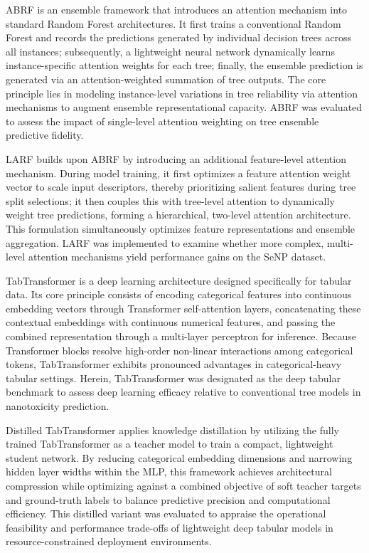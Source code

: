 ABRF is an ensemble framework that introduces an attention mechanism into standard Random Forest architectures. It first trains a conventional Random Forest and records the predictions generated by individual decision trees across all instances; subsequently, a lightweight neural network dynamically learns instance-specific attention weights for each tree; finally, the ensemble prediction is generated via an attention-weighted summation of tree outputs. The core principle lies in modeling instance-level variations in tree reliability via attention mechanisms to augment ensemble representational capacity. ABRF was evaluated to assess the impact of single-level attention weighting on tree ensemble predictive fidelity.

LARF builds upon ABRF by introducing an additional feature-level attention mechanism. During model training, it first optimizes a feature attention weight vector to scale input descriptors, thereby prioritizing salient features during tree split selections; it then couples this with tree-level attention to dynamically weight tree predictions, forming a hierarchical, two-level attention architecture. This formulation simultaneously optimizes feature representations and ensemble aggregation. LARF was implemented to examine whether more complex, multi-level attention mechanisms yield performance gains on the SeNP dataset.

TabTransformer is a deep learning architecture designed specifically for tabular data. Its core principle consists of encoding categorical features into continuous embedding vectors through Transformer self-attention layers, concatenating these contextual embeddings with continuous numerical features, and passing the combined representation through a multi-layer perceptron for inference. Because Transformer blocks resolve high-order non-linear interactions among categorical tokens, TabTransformer exhibits pronounced advantages in categorical-heavy tabular settings. Herein, TabTransformer was designated as the deep tabular benchmark to assess deep learning efficacy relative to conventional tree models in nanotoxicity prediction.

Distilled TabTransformer applies knowledge distillation by utilizing the fully trained TabTransformer as a teacher model to train a compact, lightweight student network. By reducing categorical embedding dimensions and narrowing hidden layer widths within the MLP, this framework achieves architectural compression while optimizing against a combined objective of soft teacher targets and ground-truth labels to balance predictive precision and computational efficiency. This distilled variant was evaluated to appraise the operational feasibility and performance trade-offs of lightweight deep tabular models in resource-constrained deployment environments.

